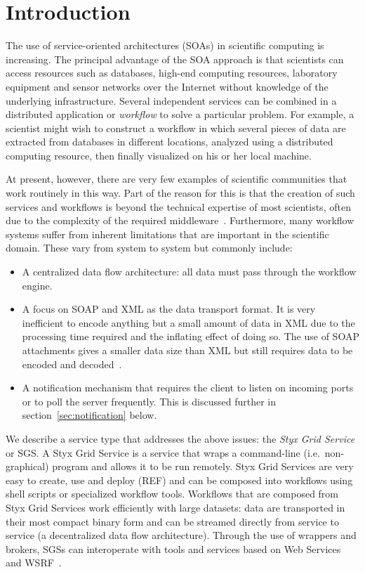 \documentclass[a4paper]{article}
\begin{document}
\section{Introduction}\label{sec:intro}
The use of service-oriented architectures (SOAs) in scientific computing is increasing.  The principal advantage of the SOA approach is that scientists can access resources such as databases, high-end computing resources, laboratory equipment and sensor networks over the Internet without knowledge of the underlying infrastructure.  Several independent services can be combined in a distributed application or \textit{workflow\/} to solve a particular problem.  For example, a scientist might wish to construct a workflow in which several pieces of data are extracted from databases in different locations, analyzed using a distributed computing resource, then finally visualized on his or her local machine.

At present, however, there are very few examples of scientific communities that work routinely in this way.  Part of the reason for this is that the creation of such services and workflows is beyond the technical expertise of most scientists, often due to the complexity of the required middleware~\cite{chin:2004}.  Furthermore, many workflow systems suffer from inherent limitations that are important in the scientific domain.  These vary from system to system but commonly include:

\begin{itemize}
\item A centralized data flow architecture: all data must pass through the workflow engine.
\item A focus on SOAP and XML as the data transport format.  It is very inefficient to encode anything but a small amount of data in XML due to the processing time required and the inflating effect of doing so.  The use of SOAP attachments gives a smaller data size than XML but still requires data to be encoded and decoded~\cite{bustamente:2000, chiu:2002, davis:2002}.
\item A notification mechanism that requires the client to listen on incoming ports or to poll the server frequently.  This is discussed further in section~\ref{sec:notification} below.
\end{itemize}

We describe a service type that addresses the above issues: the \textit{Styx Grid Service} or SGS.  A Styx Grid Service is a service that wraps a command-line (i.e.\ non-graphical) program and allows it to be run remotely.  Styx Grid Services are very easy to create, use and deploy (REF) and can be composed into workflows using shell scripts or specialized workflow tools.  Workflows that are composed from Styx Grid Services work efficiently with large datasets: data are transported in their most compact binary form and can be streamed directly from service to service (a decentralized data flow architecture).  Through the use of wrappers and brokers, SGSs can interoperate with tools and services based on Web Services and WSRF~\cite{WSRF}.
\end{document}
